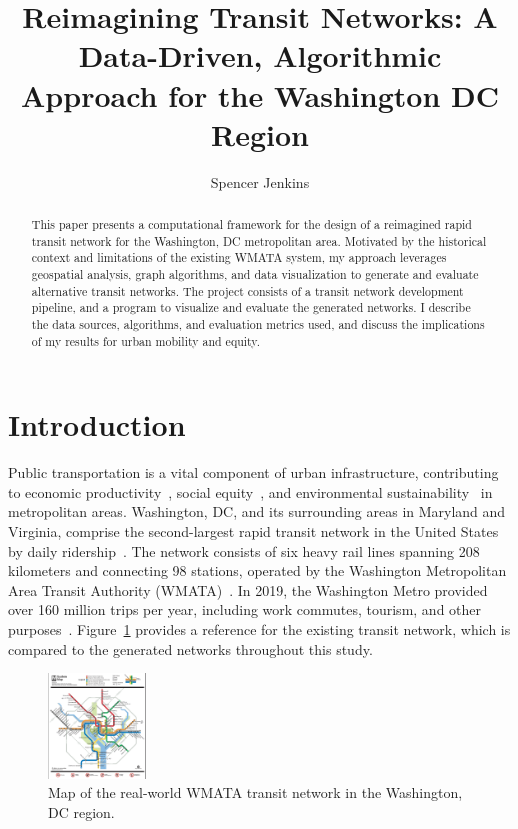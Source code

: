\documentclass[sigconf,nonacm]{acmart}
\begin{document}
\title{Reimagining Transit Networks: A Data-Driven, Algorithmic Approach for the Washington DC Region}

\author{Spencer Jenkins}

\renewcommand{\shortauthors}{S. Jenkins}

\begin{abstract}
This paper presents a computational framework for the design of a reimagined rapid transit network for the Washington, DC metropolitan area. Motivated by the historical context and limitations of the existing WMATA system, my approach leverages geospatial analysis, graph algorithms, and data visualization to generate and evaluate alternative transit networks. The project consists of a transit network development pipeline, and a program to visualize and evaluate the generated networks. I describe the data sources, algorithms, and evaluation metrics used, and discuss the implications of my results for urban mobility and equity.
\end{abstract}

\maketitle



\section{Introduction}

Public transportation is a vital component of urban infrastructure, contributing to economic productivity~\cite{lit:us_transit_policy}, social equity~\cite{lit:equity}, and environmental sustainability~\cite{lit:us_transit_policy} in metropolitan areas. Washington, DC, and its surrounding areas in Maryland and Virginia, comprise the second-largest rapid transit network in the United States by daily ridership~\cite{lit:wmata_stats}. The network consists of six heavy rail lines spanning 208 kilometers and connecting 98 stations, operated by the Washington Metropolitan Area Transit Authority (WMATA)~\cite{lit:wmata_stats}. In 2019, the Washington Metro provided over 160 million trips per year, including work commutes, tourism, and other purposes~\cite{lit:wmata_stats}. Figure~\ref{fig:wmata} provides a reference for the existing transit network, which is compared to the generated networks throughout this study. 
\begin{figure}[h]
    \centering
    \includegraphics[width=0.23\textwidth]{./img/wmata.png}
    \caption{Map of the real-world WMATA transit network in the Washington, DC region.}
    \label{fig:wmata}
\end{figure}
\end{document}
